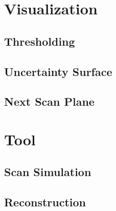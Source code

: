 \chapter{Visualization}

\section{Thresholding}\label{section:thresholding}

\section{Uncertainty Surface}\label{section:uncertaintysurface}

\section{Next Scan Plane}\label{section:nextscanplane}

\chapter{Tool}

\section{Scan Simulation}\label{section:simulatescan}

\section{Reconstruction}\label{section:reconstruction}